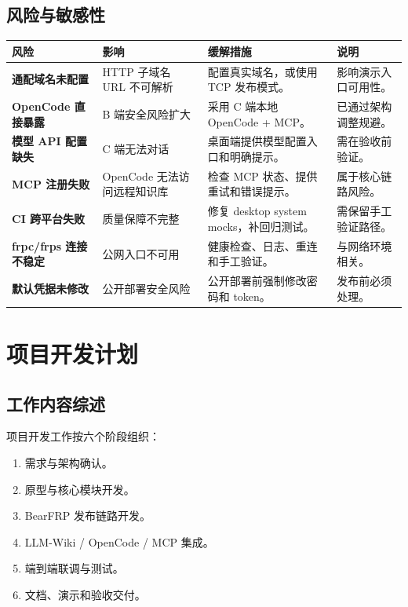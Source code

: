 \documentclass[UTF8,a4paper,12pt,fontset=fandol]{ctexart}
\begin{document}
\subsection{风险与敏感性}
\begin{longtable}{>{\bfseries}p{3.8cm}p{2.2cm}p{4.0cm}p{4.0cm}}
\toprule
风险 & 影响 & 缓解措施 & 说明 \\
\midrule
通配域名未配置 & HTTP 子域名 URL 不可解析 & 配置真实域名，或使用 TCP 发布模式。 & 影响演示入口可用性。 \\
OpenCode 直接暴露 & B 端安全风险扩大 & 采用 C 端本地 OpenCode + MCP。 & 已通过架构调整规避。 \\
模型 API 配置缺失 & C 端无法对话 & 桌面端提供模型配置入口和明确提示。 & 需在验收前验证。 \\
MCP 注册失败 & OpenCode 无法访问远程知识库 & 检查 MCP 状态、提供重试和错误提示。 & 属于核心链路风险。 \\
CI 跨平台失败 & 质量保障不完整 & 修复 desktop system mocks，补回归测试。 & 需保留手工验证路径。 \\
frpc/frps 连接不稳定 & 公网入口不可用 & 健康检查、日志、重连和手工验证。 & 与网络环境相关。 \\
默认凭据未修改 & 公开部署安全风险 & 公开部署前强制修改密码和 token。 & 发布前必须处理。 \\
\bottomrule
\end{longtable}

\section{项目开发计划}

\subsection{工作内容综述}
项目开发工作按六个阶段组织：
\begin{enumerate}
  \item 需求与架构确认。
  \item 原型与核心模块开发。
  \item BearFRP 发布链路开发。
  \item LLM-Wiki / OpenCode / MCP 集成。
  \item 端到端联调与测试。
  \item 文档、演示和验收交付。
\end{enumerate}
\end{document}
